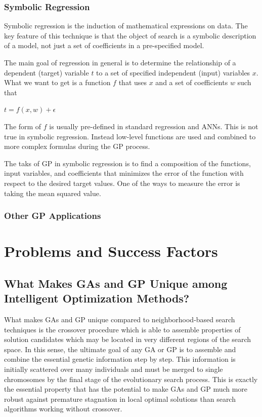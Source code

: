 \documentclass[12pt]{book}
\begin{document}
\subsection{Symbolic Regression}
Symbolic regression is the induction of mathematical expressions on data. The key feature of this technique is that the object of search is a symbolic description of a model, not just a set of coefficients in a pre-specified model.

The main goal of regression in general is to determine the relationship of a dependent (target) variable $t$ to a set of specified independent (input) variables $x$. What we want to get is a function $f$ that uses $x$ and a set of coefficients $w$ such that
\begin{center}
$t = f(x,w) + \epsilon$
\end{center}
The form of $f$ is usually pre-defined in standard regression and ANNs. This is not true in symbolic regression. Instead low-level functions are used and combined to more complex formulas during the GP process.

The taks of GP in symbolic regression is to find a composition of the functions, input variables, and coefficients that minimizes the error of the function with respect to the desired target values. One of the ways to measure the error is taking the mean squared value.
\subsection{Other GP Applications}
\clearpage
\chapter{Problems and Success Factors}
\section{What Makes GAs and GP Unique among Intelligent Optimization Methods?}
What makes GAs and GP unique compared to neighborhood-based search techniques is the crossover procedure which is able to assemble properties of solution candidates which may be located in very different regions of the search space. In this sense, the ultimate goal of any GA or GP is to assemble and combine the essential genetic information step by step. This information is initially scattered over many individuals and must be merged to single chromosomes by the final stage of the evolutionary search process. This is exactly the essential property that has the potential to make GAs and GP much more robust against premature stagnation in local optimal solutions than search algorithms working without crossover.
\end{document}
